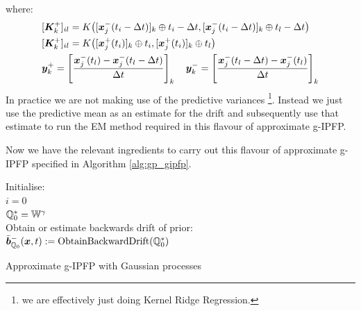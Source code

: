 \documentclass[a4paper,12pt,twoside,openright]{report}
\theoremstyle{definition}
\begin{document}
where:
\begin{align*}
   &[ {\bm{K}}_k^{+} ]_{il} = {K}\big([{\bm{x}}^{-}_j(t_i- \Delta t)]_k\oplus t_i - \Delta t, [{\bm{x}}^{-}_j(t_i - \Delta t)]_k \oplus t_l - \Delta t \big) \\
   &[ {\bm{K}}_k^{+} ]_{il} = {K}\big([{\bm{x}}^{+}_j(t_i)]_k \oplus t_i , [{\bm{x}}^{+}_j(t_i)]_k\oplus t_l \big)  \\
   &{\bm{y}}_k^{+} =  \left[\frac{{\bm{x}}^{-}_j(t_l) - {\bm{x}}^{-}_j(t_l - \Delta t)}{\Delta t}\right]_k \quad {\bm{y}}_k^{-} =  \left[\frac{{\bm{x}}^{-}_j(t_l - \Delta t)  - {\bm{x}}^{-}_j(t_l)}{\Delta t} \right]_k
\end{align*}
In practice we are not making use of the predictive variances \footnote{we are effectively just doing Kernel Ridge Regression.}. Instead we just use the predictive mean as an estimate for the drift and subsequently use that estimate to run the EM method required in this flavour of approximate g-IPFP.


Now we have the relevant ingredients to carry out this flavour of approximate g-IPFP specified in Algorithm  \ref{alg:gp_gipfp}.
\begin{algorithm} \label{alg:gp_gipfp}
Initialise:\\
$i=0$ \\
${\mathbb{Q}}^{*}_0 =\mathbb{W}^{\gamma}$\\
Obtain or estimate backwards drift of prior: \\
$\bar{{\bm{b}}}^{-}_{{\mathbb{Q}}_{0}}({\bm{x}}, t) := \text{ObtainBackwardDrift}({\mathbb{Q}}^{*}_0)$\\

\caption{ Approximate g-IPFP with Gaussian processes   }
\end{algorithm}
\end{document}
